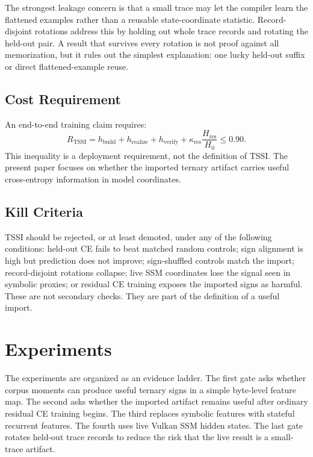 \documentclass{article}
\begin{document}
The strongest leakage concern is that a small trace may let the compiler learn
the flattened examples rather than a reusable state-coordinate statistic.
Record-disjoint rotations address this by holding out whole trace records and
rotating the held-out pair. A result that survives every rotation is not proof
against all memorization, but it rules out the simplest explanation: one lucky
held-out suffix or direct flattened-example reuse.

\subsection{Cost Requirement}

An end-to-end training claim requires:
\begin{equation}
  R_{\mathrm{TSSI}} =
  h_{\mathrm{build}} + h_{\mathrm{realize}} + h_{\mathrm{verify}}
  + \kappa_{\mathrm{res}} \frac{H_{\mathrm{res}}}{H_0}
  \leq 0.90.
\end{equation}
This inequality is a deployment requirement, not the definition of TSSI. The
present paper focuses on whether the imported ternary artifact carries useful
cross-entropy information in model coordinates.

\subsection{Kill Criteria}

TSSI should be rejected, or at least demoted, under any of the following
conditions: held-out CE fails to beat matched random controls; sign alignment is
high but prediction does not improve; sign-shuffled controls match the import;
record-disjoint rotations collapse; live SSM coordinates lose the signal seen
in symbolic proxies; or residual CE training exposes the imported signs as
harmful. These are not secondary checks. They are part of the definition of a
useful import.

\section{Experiments}

The experiments are organized as an evidence ladder. The first gate asks
whether corpus moments can produce useful ternary signs in a simple byte-level
feature map. The second asks whether the imported artifact remains useful after
ordinary residual CE training begins. The third replaces symbolic features with
stateful recurrent features. The fourth uses live Vulkan SSM hidden states. The
last gate rotates held-out trace records to reduce the risk that the live result
is a small-trace artifact.
\end{document}
